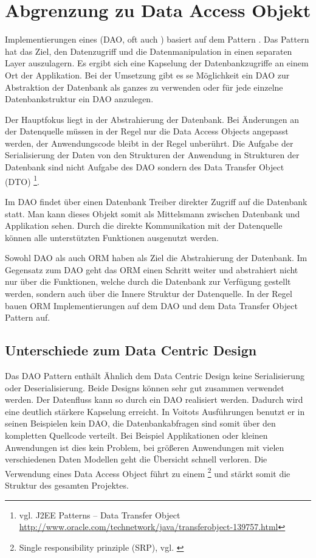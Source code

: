 \section{Abgrenzung zu Data Access Objekt}
Implementierungen eines  (DAO, oft auch ) basiert auf dem  Pattern \cite{j2ee-pattern}.  Das Pattern hat das Ziel, den Datenzugriff und die Datenmanipulation in einen separaten Layer auszulagern. Es ergibt sich eine Kapselung der Datenbankzugriffe an einem Ort der Applikation. Bei der Umsetzung gibt es se Möglichkeit ein DAO zur Abstraktion der Datenbank als ganzes zu verwenden oder für jede einzelne Datenbankstruktur ein DAO anzulegen.

Der Hauptfokus liegt in der Abstrahierung der Datenbank. Bei Änderungen an der Datenquelle müssen in der Regel nur die Data Access Objects angepasst werden, der Anwendungscode bleibt in der Regel unberührt. Die Aufgabe der Serialisierung der Daten von den Strukturen der Anwendung in Strukturen der Datenbank sind nicht Aufgabe des DAO sondern des Data Transfer Object (DTO) \footnote{vgl. J2EE Patterns – Data Transfer Object \url{http://www.oracle.com/technetwork/java/transferobject-139757.html}}.

Im DAO findet über einen Datenbank Treiber direkter Zugriff auf die Datenbank statt. Man kann dieses Objekt somit als Mittelsmann zwischen Datenbank und Applikation sehen. Durch die direkte Kommunikation mit der Datenquelle können alle unterstützten Funktionen ausgenutzt werden. 

Sowohl DAO als auch ORM haben als Ziel die Abstrahierung der Datenbank. Im Gegensatz zum DAO geht das ORM einen Schritt weiter und abstrahiert nicht nur über die Funktionen, welche durch die Datenbank zur Verfügung gestellt werden, sondern auch über die Innere Struktur der Datenquelle. In der Regel bauen ORM Implementierungen auf dem DAO und dem Data Transfer Object Pattern auf.

\subsection{Unterschiede zum Data Centric Design}
Das DAO Pattern enthält Ähnlich dem Data Centric Design keine Serialisierung oder Deserialisierung. Beide Designs können sehr gut zusammen verwendet werden. Der Datenfluss kann so durch ein DAO realisiert werden. Dadurch wird eine deutlich stärkere Kapselung erreicht. In Voitots Ausführungen benutzt er in seinen Beispielen kein DAO, die Datenbankabfragen sind somit über den kompletten Quellcode verteilt. Bei Beispiel Applikationen oder kleinen Anwendungen ist dies kein Problem, bei größeren Anwendungen mit vielen verschiedenen Daten Modellen geht die Übersicht schnell verloren. Die Verwendung eines {Data Access Object} führt zu einem \footnote{ Single responsibility prinziple (SRP), vgl. \cite[p.~339]{design-patterns}}
 und stärkt somit die Struktur des gesamten Projektes. 

